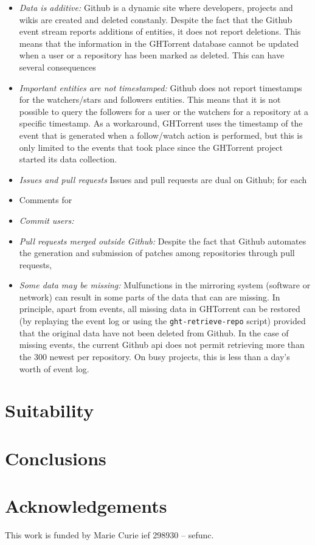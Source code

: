 \documentclass[conference]{IEEEtran}
\begin{document}
\begin{itemize}

  \item \emph{Data is additive:} Github is a dynamic site where developers, 
    projects and wikis are created and deleted constanly. Despite the fact
    that the Github event stream reports additions of entities, it does
    not report deletions. This means that the information in the GHTorrent 
    database cannot be updated when a user or a repository has been marked
    as deleted. This can have several consequences 

  \item \emph{Important entities are not timestamped:} Github does not report
    timestamps for the watchers/stars and followers entities. This means that it
    is not possible to query the followers for a user or the watchers for a
    repository at a specific timestamp. As a workaround, GHTorrent uses the
    timestamp of the event that is generated when a follow/watch action is
    performed, but this is only limited to the events that took place since
    the GHTorrent project started its data collection.

  \item \emph{Issues and pull requests} Issues and pull requests are dual on
    Github; for each 

  \item Comments for  

  \item \emph{Commit users:}

  \item \emph{Pull requests merged outside Github:} Despite the fact that Github
    automates the generation and submission of patches among repositories
    through pull requests, 

  \item \emph{Some data may be missing:} 
    Mulfunctions in the mirroring system (software or network) can result in 
    some parts of the data that can are missing. In principle, apart from
    events, all missing data in GHTorrent can be restored (by replaying the
    event log or using the \texttt{ght-retrieve-repo} script) provided that the
    original data have not been deleted from Github. In the case of missing
    events, the current Github {\sc api} does not permit retrieving more than
    the 300 newest per repository. On busy projects, this is less than
    a day's worth of event log.

\end{itemize}

\section{Suitability}



\section{Conclusions}

\section*{Acknowledgements}
This work is funded by Marie Curie {\sc ief} 298930 -- {\sc sefunc}.



\end{document}
